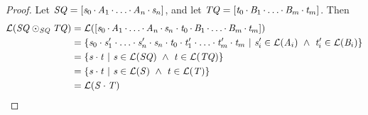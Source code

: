 \documentclass[acmsmall,screen,anonymous]{acmart}
\begin{document}
\begin{proof}
  Let $\mathit{SQ}=[\mathit{s}_0\mkern-1mu\cdot\mkern-1mu\mathit{A}_1\mkern-1mu\cdot\mkern-1mu\ldots
    \mkern-1mu\cdot\mkern-1mu\mathit{A}_n\mkern-1mu\cdot\mkern-1mu\mathit{s}_n]$, and
  let $\mathit{TQ}=[\mathit{t}_0\mkern-1mu\cdot\mkern-1mu\mathit{B}_1\mkern-1mu\cdot\mkern-1mu\ldots
  \mkern-1mu\cdot\mkern-1mu\mathit{B}_m\mkern-1mu\cdot\mkern-1mu\mathit{t}_m]$. Then
  \begin{align*}  
    \mathcal{L}(\mathit{SQ}\odot_{\mathit{SQ}}\mathit{TQ}) & = 
                                                              \mathcal{L}([\mathit{s}_0\mkern-1mu\cdot\mkern-1mu\mathit{A}_1\mkern-1mu\cdot\mkern-1mu\ldots
                                                              \mkern-1mu\cdot\mkern-1mu\mathit{A}_n\mkern-1mu\cdot\mkern-1mu\mathit{s}_n\cdot\mathit{t}_0\mkern-1mu\cdot\mkern-1mu{}
                                                              \mathit{B}_1\mkern-1mu\cdot\mkern-1mu\ldots\mkern-1mu\cdot\mkern-1mu\mathit{B}_m\mkern-1mu\cdot\mkern-1mu\mathit{t}_m]) \\
                                                            & = 
                                                              \{\mathit{s}_0\cdot\mathit{s}_1'\cdot\ldots\cdot\mathit{s}_n'\cdot\mathit{s}_n
                                                              \cdot\mathit{t}_0\cdot\mathit{t}_1'\cdot\ldots
                                                              \cdot\mathit{t}_m'\cdot\mathit{t}_m~|~{} \mathit{s}_i'\in\mathcal{L}(\mathit{A}_i) ~\wedge~{}
                                                              \mathit{t}_i'\in\mathcal{L}(\mathit{B}_i)\}\\
                                                            & = 
                                                              \{\mathit{s}\cdot\mathit{t}{} ~|~{} \mathit{s}\in\mathcal{L}(\mathit{SQ})
                                                              ~\wedge~{} \mathit{t}\in\mathcal{L}(\mathit{TQ})\}\\
                                                            & =
                                                              \{\mathit{s}\cdot\mathit{t}{} ~|~{} \mathit{s}\in\mathcal{L}(\mathit{S})
                                                              ~\wedge~{} \mathit{t}\in\mathcal{L}(\mathit{T})\}\\
                                                            & =
                                                              \mathcal{L}(\mathit{S}\cdot\mathit{T})
\end{align*}
\end{proof}
\end{document}
